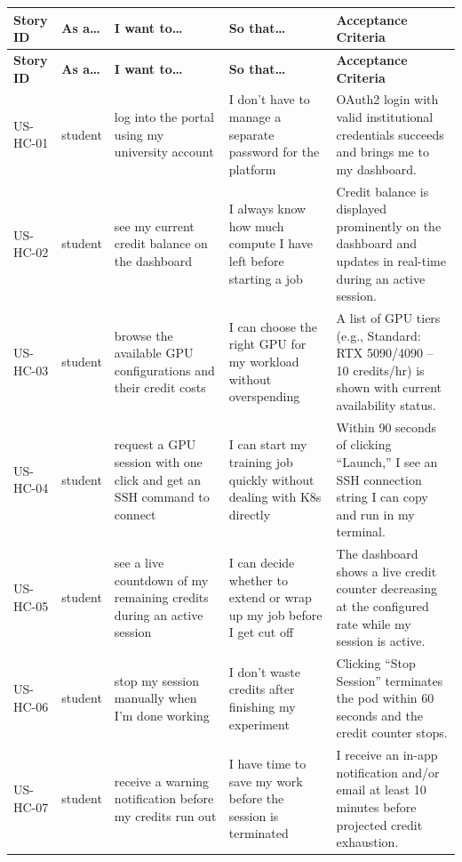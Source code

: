 \documentclass[12pt,a4paper]{article}
\begin{document}
\begin{longtable}{@{}L{2.3cm}L{2.3cm}L{4cm}L{3.5cm}L{3.5cm}@{}}
  
    \textbf{Story ID} & \textbf{As a\ldots} & \textbf{I want to\ldots} & \textbf{So that\ldots} & \textbf{Acceptance Criteria} \\
  \midrule
  \endfirsthead
  
    \textbf{Story ID} & \textbf{As a\ldots} & \textbf{I want to\ldots} & \textbf{So that\ldots} & \textbf{Acceptance Criteria} \\
  \midrule
  \endhead
  
  \endfoot

  US-HC-01 & student & log into the portal using my university account & I don't have to manage a separate password for the platform & OAuth2 login with valid institutional credentials succeeds and brings me to my dashboard. \\
    US-HC-02 & student & see my current credit balance on the dashboard & I always know how much compute I have left before starting a job & Credit balance is displayed prominently on the dashboard and updates in real-time during an active session. \\
  US-HC-03 & student & browse the available GPU configurations and their credit costs & I can choose the right GPU for my workload without overspending & A list of GPU tiers (e.g., Standard: RTX 5090/4090 -- 10 credits/hr) is shown with current availability status. \\
    US-HC-04 & student & request a GPU session with one click and get an SSH command to connect & I can start my training job quickly without dealing with K8s directly & Within 90 seconds of clicking ``Launch,'' I see an SSH connection string I can copy and run in my terminal. \\
  US-HC-05 & student & see a live countdown of my remaining credits during an active session & I can decide whether to extend or wrap up my job before I get cut off & The dashboard shows a live credit counter decreasing at the configured rate while my session is active. \\
    US-HC-06 & student & stop my session manually when I'm done working & I don't waste credits after finishing my experiment & Clicking ``Stop Session'' terminates the pod within 60 seconds and the credit counter stops. \\
  US-HC-07 & student & receive a warning notification before my credits run out & I have time to save my work before the session is terminated & I receive an in-app notification and/or email at least 10 minutes before projected credit exhaustion. \\

\end{longtable}
\end{document}

